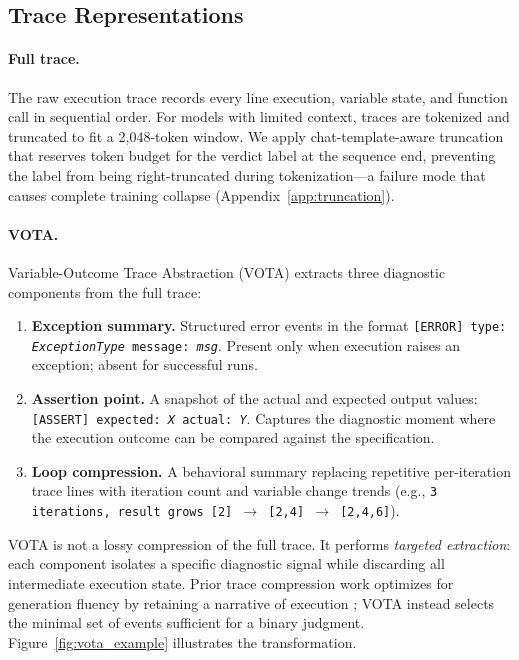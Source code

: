 \subsection{Trace Representations}
\label{sec:vota}

\paragraph{Full trace.}
The raw execution trace records every line execution, variable state, and function call in sequential order.
For models with limited context, traces are tokenized and truncated to fit a 2{,}048-token window.
We apply chat-template-aware truncation that reserves token budget for the verdict label at the sequence end, preventing the label from being right-truncated during tokenization---a failure mode that causes complete training collapse (Appendix~\ref{app:truncation}).

\paragraph{VOTA.}
Variable-Outcome Trace Abstraction (VOTA) extracts three diagnostic components from the full trace:

\begin{enumerate}[itemsep=2pt,parsep=0pt,topsep=4pt]
\item \textbf{Exception summary.}
Structured error events in the format \texttt{[ERROR] type: \textit{ExceptionType} message: \textit{msg}}.
Present only when execution raises an exception; absent for successful runs.

\item \textbf{Assertion point.}
A snapshot of the actual and expected output values: \texttt{[ASSERT] expected: \textit{X} actual: \textit{Y}}.
Captures the diagnostic moment where the execution outcome can be compared against the specification.

\item \textbf{Loop compression.}
A behavioral summary replacing repetitive per-iteration trace lines with iteration count and variable change trends (e.g., \texttt{3 iterations, result grows [2] $\to$ [2,4] $\to$ [2,4,6]}).
\end{enumerate}

VOTA is not a lossy compression of the full trace.
It performs \emph{targeted extraction}: each component isolates a specific diagnostic signal while discarding all intermediate execution state.
Prior trace compression work optimizes for generation fluency by retaining a narrative of execution \citep{placeholder_FerrandoArXiv2025,placeholder_TraceCoderICSE2026}; VOTA instead selects the minimal set of events sufficient for a binary judgment.
Figure~\ref{fig:vota_example} illustrates the transformation.

